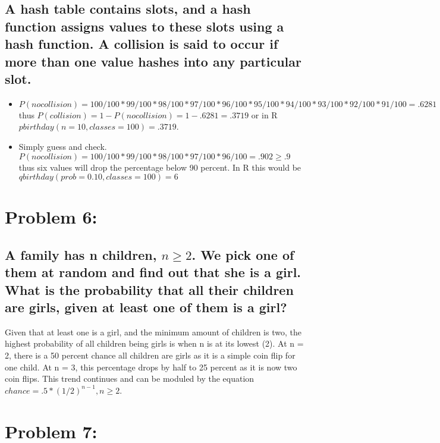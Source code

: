 \documentclass{article} %
\begin{document}
\subsection{A hash table contains slots, and a hash function assigns values to these slots using a hash
function. A collision is said to occur if more than one value hashes into any particular slot.}
\begin{itemize}
    \item \(P(no collision) = 100/100 * 99/100 * 98/100 * 97/100 * 96/100 * 95/100 * 94/100 * 93/100 * 92/100 * 91/100 = .6281\)
    thus \(P(collision) = 1 - P(no collision) = 1 - .6281 = .3719\) or in R \(pbirthday(n = 10, classes = 100) = .3719\).
    \item Simply guess and check. \(P(no collision) = 100/100 * 99/100 * 98/100 * 97/100 * 96/100 = .902 \geq .9\) thus six values
    will drop the percentage below 90 percent. In R this would be \(qbirthday(prob = 0.10, classes = 100) = 6\)

\end{itemize}

\section{Problem 6:}
\subsection{A family has n children, \(n \geq 2\). We pick one of them at random and find out that she is a
girl. What is the probability that all their children are girls, given at least one of them is a girl?}

Given that at least one is a girl, and the minimum amount of children is two, the highest probability of all 
children being girls is when n is at its lowest (2). At n = 2, there is a 50 percent chance all children are girls
as it is a simple coin flip for one child. At n = 3, this percentage drops by half  to 25 percent as it is now two 
coin flips. This trend continues and can be moduled by the equation \(chance = .5 * (1/2)^{n-1}, n \geq 2\).


\section{Problem 7:}
\end{document}
